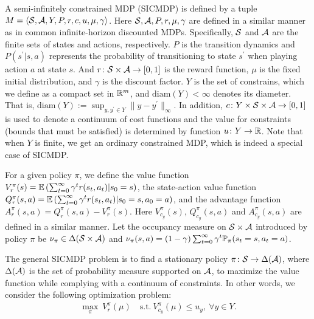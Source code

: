 A semi-infinitely constrained MDP (SICMDP) is defined by a tuple $M=\langle {\mathcal{S}},{\mathcal{A}},Y,P,r,c,u,\mu,\gamma\rangle$.
Here ${\mathcal{S}}, {\mathcal{A}}, P, r, \mu, \gamma$ are defined in a similar manner as in common infinite-horizon discounted MDPs.
Specifically, ${\mathcal{S}}$ and ${\mathcal{A}}$ are the finite sets of states and actions, respectively. 
$P$ is the transition dynamics and $P(s^\prime|s,a)$ represents the probability of transitioning to state $s^\prime$ when playing action $a$ at state $s$. And
$r\colon {\mathcal{S}}\times {\mathcal{A}}\to[0,1]$ is the reward function,  
$\mu$ is the fixed initial distribution, and $\gamma$ is the discount factor.
$Y$ is the set of constrains, which we define as a compact set in ${\mathbb R}^m$, and $\mathrm{diam}(Y)<\infty$ denotes its diameter.
That is, $\mathrm{diam}(Y):=\sup_{y,y^\prime\in Y}{\|y-y^\prime\|_\infty}$.
In addition, $c\colon Y\times {\mathcal{S}}\times {\mathcal{A}}\to[0,1]$ is used to denote a continuum of cost functions and the value for constraints (bounds that must be satisfied) is determined by function $u\colon Y\to {\mathbb R}$. 
Note that when $Y$ is finite, we get an ordinary constrained MDP, which is indeed a special case of SICMDP.


For a given policy $\pi$, we define the value function ${V^\pi_r(s)={\mathbb E}\left(\sum_{t=0}^\infty \gamma^tr(s_t,a_t)|s_0=s\right)}$, the state-action value function ${Q^\pi_r(s,a)={\mathbb E}\left(\sum_{t=0}^\infty \gamma^tr(s_t,a_t)|s_0=s,a_0=a\right)}$, and the advantage function ${A^\pi_r(s,a)=Q^\pi_r(s,a)-V^\pi_r(s)}$. Here
$V_{c_y}^\pi(s)$, $Q_{c_y}^\pi(s,a)$ and $A_{c_y}^\pi(s,a)$ are defined in a similar manner.
Let the occupancy measure on ${\mathcal{S}}\times {\mathcal{A}}$ introduced by policy $\pi$ be $\nu_\pi\in\Delta({\mathcal{S}}\times {\mathcal{A}})$ and ${\nu_\pi(s,a)=(1-\gamma)\sum_{t=0}^\infty\gamma^t {\mathbb P}_\pi(s_t=s,a_t=a)}$.

The general SICMDP problem is to find a stationary policy $\pi\colon {\mathcal{S}}\to \Delta({\mathcal{A}})$, where $\Delta({\mathcal{A}})$ is the set of probability measure supported on ${\mathcal{A}}$, to maximize the value function while complying with a continuum of constraints. 
In other words, we  consider the following optimization problem:
\begin{equation}\label{Problem_SICMDP} \tag{M}
\begin{aligned}
\max_{\pi}\ V_r^\pi(\mu)\quad
\text{s.t.}\ V_{c_y}^\pi(\mu) \leq u_y,\ \forall y\in Y. 
\end{aligned}
\end{equation}

